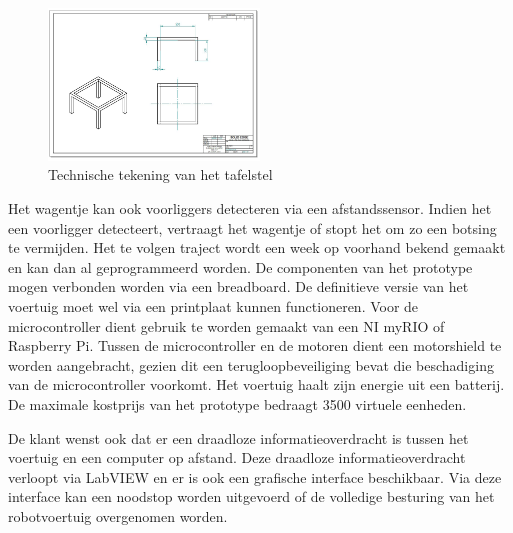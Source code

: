 \documentclass[a4paper,kulak]{kulakarticle} %
\begin{document}
\begin{figure}
	\centering
	\includegraphics[width=0.5\textwidth]{tafelstel.png}
	\caption{Technische tekening van het tafelstel}
	\label{tafel}
\end{figure}

Het wagentje kan ook voorliggers detecteren via een afstandssensor. Indien het een voorligger detecteert, vertraagt het wagentje of stopt het om zo een botsing te vermijden.
Het te volgen traject wordt een week op voorhand bekend gemaakt en kan dan al geprogrammeerd worden.
De componenten van het prototype mogen verbonden worden via een breadboard. De definitieve versie van het voertuig moet wel via een printplaat kunnen functioneren. Voor de microcontroller dient gebruik te worden gemaakt van een NI myRIO of Raspberry Pi. Tussen de microcontroller en de motoren dient een motorshield te worden aangebracht, gezien dit een terugloopbeveiliging bevat die beschadiging van de microcontroller voorkomt. Het voertuig haalt zijn energie uit een batterij. De maximale kostprijs van het prototype bedraagt 3500 virtuele eenheden.

De klant wenst ook dat er een draadloze informatieoverdracht is tussen het voertuig en een computer op afstand. Deze draadloze informatieoverdracht verloopt via LabVIEW en er is ook een grafische interface beschikbaar. Via deze interface kan een noodstop worden uitgevoerd of de volledige besturing van het robotvoertuig overgenomen worden.
\end{document}
